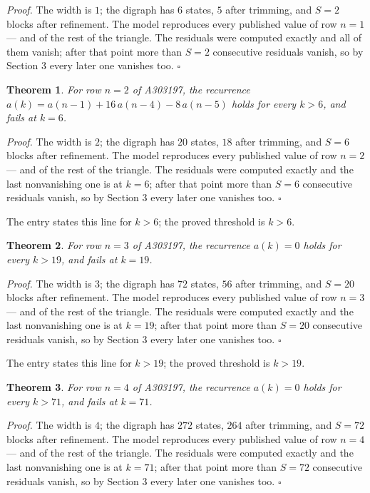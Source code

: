 \documentclass[11pt]{article}
\newtheorem{theorem}{Theorem}
\theoremstyle{definition}
\begin{document}
{\itshape Proof.} The width is $1$; the digraph has $6$ states, $5$ after trimming, and $S = 2$ blocks after refinement. The model reproduces every published value of row $n = 1$ --- and of the rest of the triangle. The residuals were computed exactly and all of them vanish; after that point more than $S = 2$ consecutive residuals vanish, so by Section 3 every later one vanishes too. $\square$

\begin{theorem} For row $n = 2$ of A303197, the recurrence $a(k) = a(n-1) + 16\,a(n-4) - 8\,a(n-5)$ holds for every $k > 6$, and fails at $k = 6$.\end{theorem}

{\itshape Proof.} The width is $2$; the digraph has $20$ states, $18$ after trimming, and $S = 6$ blocks after refinement. The model reproduces every published value of row $n = 2$ --- and of the rest of the triangle. The residuals were computed exactly and the last nonvanishing one is at $k = 6$; after that point more than $S = 6$ consecutive residuals vanish, so by Section 3 every later one vanishes too. $\square$

The entry states this line for $k > 6$; the proved threshold is $k > 6$.

\begin{theorem} For row $n = 3$ of A303197, the recurrence $a(k) = 0$ holds for every $k > 19$, and fails at $k = 19$.\end{theorem}

{\itshape Proof.} The width is $3$; the digraph has $72$ states, $56$ after trimming, and $S = 20$ blocks after refinement. The model reproduces every published value of row $n = 3$ --- and of the rest of the triangle. The residuals were computed exactly and the last nonvanishing one is at $k = 19$; after that point more than $S = 20$ consecutive residuals vanish, so by Section 3 every later one vanishes too. $\square$

The entry states this line for $k > 19$; the proved threshold is $k > 19$.

\begin{theorem} For row $n = 4$ of A303197, the recurrence $a(k) = 0$ holds for every $k > 71$, and fails at $k = 71$.\end{theorem}

{\itshape Proof.} The width is $4$; the digraph has $272$ states, $264$ after trimming, and $S = 72$ blocks after refinement. The model reproduces every published value of row $n = 4$ --- and of the rest of the triangle. The residuals were computed exactly and the last nonvanishing one is at $k = 71$; after that point more than $S = 72$ consecutive residuals vanish, so by Section 3 every later one vanishes too. $\square$
\end{document}
